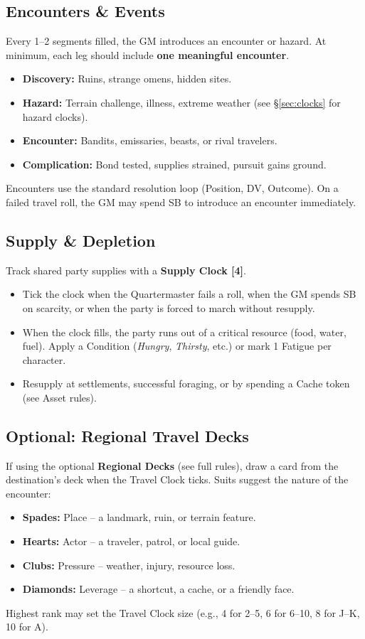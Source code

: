 \subsection{Encounters \& Events}
Every 1--2 segments filled, the GM introduces an encounter or hazard. At minimum, each leg should include \textbf{one meaningful encounter}.
\begin{itemize}
  \item \textbf{Discovery:} Ruins, strange omens, hidden sites.
  \item \textbf{Hazard:} Terrain challenge, illness, extreme weather (see \S\ref{sec:clocks} for hazard clocks).
  \item \textbf{Encounter:} Bandits, emissaries, beasts, or rival travelers.
  \item \textbf{Complication:} Bond tested, supplies strained, pursuit gains ground.
\end{itemize}
Encounters use the standard resolution loop (Position, DV, Outcome). On a failed travel roll, the GM may spend SB to introduce an encounter immediately.

\subsection{Supply \& Depletion}
Track shared party supplies with a \textbf{Supply Clock [4]}.
\begin{itemize}
  \item Tick the clock when the Quartermaster fails a roll, when the GM spends SB on scarcity, or when the party is forced to march without resupply.
  \item When the clock fills, the party runs out of a critical resource (food, water, fuel). Apply a Condition (\emph{Hungry}, \emph{Thirsty}, etc.) or mark 1 Fatigue per character.
  \item Resupply at settlements, successful foraging, or by spending a Cache token (see Asset rules).
\end{itemize}

\subsection{Optional: Regional Travel Decks}
If using the optional \textbf{Regional Decks} (see full rules), draw a card from the destination's deck when the Travel Clock ticks. Suits suggest the nature of the encounter:
\begin{itemize}
  \item \textbf{Spades:} Place -- a landmark, ruin, or terrain feature.
  \item \textbf{Hearts:} Actor -- a traveler, patrol, or local guide.
  \item \textbf{Clubs:} Pressure -- weather, injury, resource loss.
  \item \textbf{Diamonds:} Leverage -- a shortcut, a cache, or a friendly face.
\end{itemize}
Highest rank may set the Travel Clock size (e.g., 4 for 2--5, 6 for 6--10, 8 for J--K, 10 for A).


